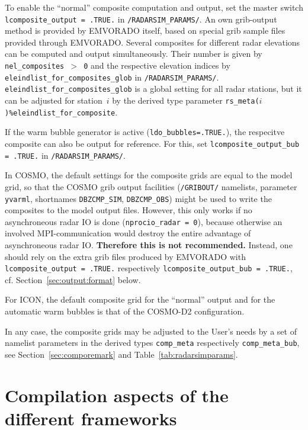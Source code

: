 \documentclass[10pt,a4paper,twoside,headinclude,footinclude,parskip=half]{scrartcl}
\newcommand{\myaktuellesection}{sec:intro}%
\newcommand{\labelsec}[1]{\label{#1}\renewcommand{\myaktuellesection}{#1}}%
\newcommand{\labelsec}[1]{\label{#1}}%
\newcommand{\srcform}[1]{\mbox{\texttt{#1}}\xspace}%
\newcommand{\paramform}[1]{\mbox{\texttt{#1}}\xspace}%
\begin{document}
To enable the ``normal'' composite computation and output, set the master switch \srcform{lcomposite_output = .TRUE.} in \srcform{/RADARSIM_PARAMS/}.
An own grib-output method is provided by EMVORADO itself, based on special grib sample files provided through EMVORADO.
Several composites for different radar elevations can be computed and output simultaneously. Their number is given by \srcform{nel_composites $>$~0} and
the respective elevation indices by \srcform{eleindlist_for_composites_glob} in
\srcform{/RADARSIM_PARAMS/}. \srcform{eleindlist_for_composites_glob} is a global setting for all radar stations, but it can be
adjusted for station~$i$ by the derived type parameter \srcform{rs_meta($i$)\%eleindlist_for_composite}.

If the warm bubble generator is active (\srcform{ldo_bubbles=.TRUE.}), the respecitve composite can also be output for reference. For this, set \srcform{lcomposite_output_bub = .TRUE.} in \srcform{/RADARSIM_PARAMS/}.

In COSMO, the default settings for the composite grids are equal to the model grid,
so that the COSMO grib output facilities (\srcform{/GRIBOUT/} namelists, parameter \srcform{yvarml}, shortnames \srcform{DBZCMP_SIM}, \srcform{DBZCMP_OBS}) might be used
to write the composites to the model output files. However, this only works if no asynchroneous
radar IO is done (\srcform{nprocio_radar =~0}), because otherwise an involved MPI-communication would
destroy the entire advantage of asynchroneous radar IO. \textbf{Therefore this is not recommended.}
Instead, one should rely on the extra grib files produced by EMVORADO with \srcform{lcomposite_output = .TRUE.} respectively \srcform{lcomposite_output_bub = .TRUE.},
cf. Section~\ref{sec:output:format} below.

For ICON, the default composite grid for the ``normal'' output and for the automatic warm bubbles is that of the COSMO-D2 configuration.

In any case, the composite grids may be adjusted to the User's needs by
a set of namelist parameters in the derived types \paramform{comp_meta} respectively \paramform{comp_meta_bub}, see Section~\ref{sec:comporemark} and Table~\ref{tab:radarsimparams}.


\section{Compilation aspects of the different frameworks}

\labelsec{sec:compil}
\end{document}
